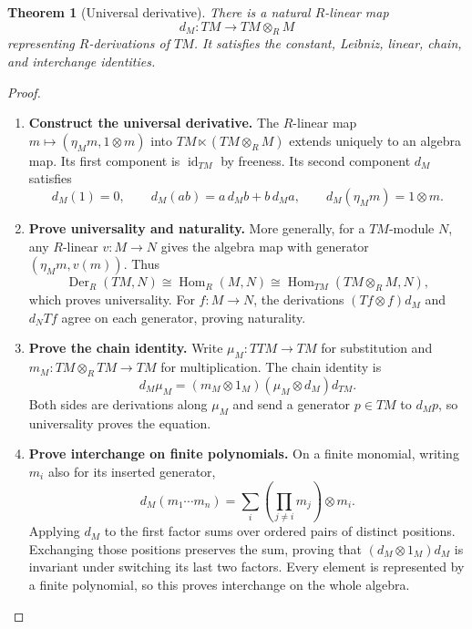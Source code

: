 \documentclass[11pt,a4paper]{article}
\numberwithin{algorithm}{section}
\numberwithin{equation}{section}
\newtheorem{theorem}{Theorem}[section]
\theoremstyle{definition}
\theoremstyle{remark}
\theoremstyle{plain}
\newcommand{\id}{\operatorname{id}}
\newcommand{\Hom}{\operatorname{Hom}}
\newcommand{\Der}{\operatorname{Der}}
\theoremstyle{definition}
\theoremstyle{plain}
\begin{document}
\begin{theorem}[Universal derivative]\label{thm:derivative}
There is a natural $R$-linear map
\[
 d_M:TM\longrightarrow TM\otimes_R M
\]
representing $R$-derivations of $TM$. It satisfies the constant,
Leibniz, linear, chain, and interchange identities.
\end{theorem}
\begin{proof}\leavevmode
\begin{enumerate}[leftmargin=*,align=left]
\item \textbf{Construct the universal derivative.}
The $R$-linear map
$m\mapsto(\eta_Mm,1\otimes m)$ into
$TM\ltimes(TM\otimes_R M)$ extends uniquely to an algebra map.
Its first component is $\id_{TM}$ by freeness. Its second component
$d_M$ satisfies
\begin{equation}\label{eq:d-identities}
 d_M(1)=0,\qquad d_M(ab)=a\,d_Mb+b\,d_Ma,\qquad
 d_M(\eta_Mm)=1\otimes m.
\end{equation}

\item \textbf{Prove universality and naturality.}
More generally, for a $TM$-module $N$, any $R$-linear $v:M\to N$
gives the algebra map with generator $(\eta_Mm,v(m))$. Thus
\[
 \Der_R(TM,N)\cong\Hom_R(M,N)
 \cong\Hom_{TM}(TM\otimes_R M,N),
\]
which proves universality. For $f:M\to N$, the derivations
$(Tf\otimes f)d_M$ and $d_NTf$ agree on each generator, proving
naturality.

\item \textbf{Prove the chain identity.}
Write $\mu_M:TTM\to TM$ for substitution and
$m_M:TM\otimes_RTM\to TM$ for multiplication. The chain identity is
\begin{equation}\label{eq:monadic-chain}
 d_M\mu_M=(m_M\otimes1_M)(\mu_M\otimes d_M)d_{TM}.
\end{equation}
Both sides are derivations along $\mu_M$ and send a generator
$p\in TM$ to $d_Mp$, so universality proves the equation.

\item \textbf{Prove interchange on finite polynomials.}
On a finite monomial, writing $m_i$ also for its inserted generator,
\begin{equation}\label{eq:monomial-d}
 d_M(m_1\cdots m_n)
 =\sum_i\left(\prod_{j\ne i}m_j\right)\otimes m_i.
\end{equation}
Applying $d_M$ to the first factor sums over ordered pairs of distinct
positions. Exchanging those positions preserves the sum, proving that
$(d_M\otimes1_M)d_M$ is invariant under switching its last two factors.
Every element is represented by a finite polynomial, so this proves
interchange on the whole algebra.
\end{enumerate}
\end{proof}
\end{document}
